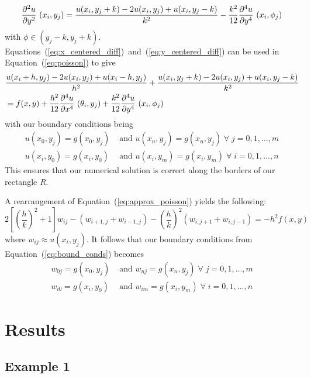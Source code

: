 \documentclass[12pt, titlepage]{article}
\begin{document}
    \begin{equation}\label{eq:y_centered_diff}
        \pdv[2]{u}{y}~(x_i, y_j) = \frac{u(x_i, y_j + k) - 2u(x_i, y_j) + u(x_i, y_j-k)}{k^2} - \frac{k^2}{12}\pdv[4]{u}{y}~(x_i, \phi_j)
    \end{equation}
    with $\phi \in (y_j-k,y_j+k)$. Equations~(\ref{eq:x_centered_diff})~and~(\ref{eq:y_centered_diff}) can be used in Equation~(\ref{eq:poisson}) to give
    \begin{equation}\label{eq:approx_poisson}
        \begin{split}
            &\frac{u(x_i + h, y_j) - 2u(x_i, y_j) + u(x_i - h, y_j)}{h^2} + \frac{u(x_i, y_j + k) - 2u(x_i, y_j) + u(x_i, y_j-k)}{k^2}\\
            &= f(x,y) + \frac{h^2}{12}\pdv[4]{u}{x}~(\theta_i, y_j) + \frac{k^2}{12}\pdv[4]{u}{y}~(x_i, \phi_j)
        \end{split}
    \end{equation}
    with our boundary conditions being
    \begin{equation}\label{eq:bound_conds}
        \begin{split}
            u(x_0, y_j) = g(x_0, y_j)&\text{ and }u(x_n, y_j) = g(x_n, y_j) \;\forall\;j=0,1,\dots,m\\
            u(x_i, y_0) = g(x_i, y_0)&\text{ and }u(x_i, y_m) = g(x_i, y_m) \;\forall\;i=0,1,\dots,n
        \end{split}
    \end{equation}
    This ensures that our numerical solution is correct along the borders of our rectangle \textit{R}.

    A rearrangement of Equation~(\ref{eq:approx_poisson}) yields the following:
    \begin{equation}
        2\left[\left(\frac{h}{k}\right)^2 + 1\right]w_{ij} - (w_{i+1,j} + w_{i-1,j})-\left(\frac{h}{k}\right)^2 (w_{i,j+1}+w_{i,j-1}) = -h^2f(x,y)
    \end{equation}
    where $w_{ij}\approx u(x_i, y_j)$. It follows that our boundary conditions from Equation~(\ref{eq:bound_conds}) becomes
    \begin{align*}
        w_{0j} = g(x_0, y_j)&\text{ and }w_{nj} = g(x_n, y_j) \;\forall\;j=0,1,\dots,m\\
        w_{i0} = g(x_i, y_0)&\text{ and }w_{im} = g(x_i, y_m) \;\forall\;i=0,1,\dots,n
    \end{align*}
    \section{Results}
    \subsection{Example 1}
    \newpage 
    
    {}
\end{document}
